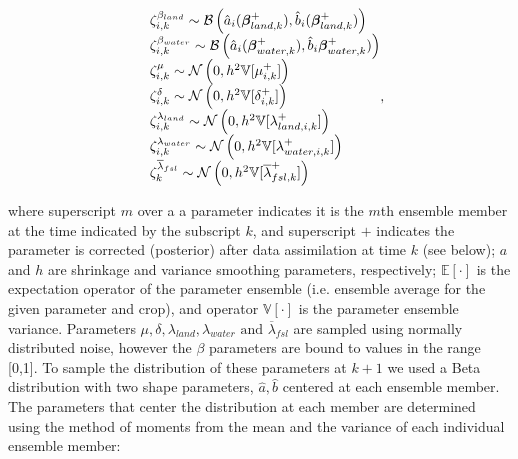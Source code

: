 \begin{equation}
\begin{matrix*}[l]
    &\zeta_{i,k}^{\beta_{land}} \sim \mathcal{B}\left(\hat{a}_i(\*\beta_{land,k}^{+}), \hat{b}_i(\*\beta_{land,k}^{+}) \right)\\
    &\zeta_{i,k}^{\beta_{water}} \sim \mathcal{B}\left(\hat{a}_i(\*\beta_{water,k}^{+}), \hat{b}_i\*\beta_{water,k}^{+}) \right)\\
    &\zeta_{i,k}^\mu \sim \mathcal{N}\left(0, h^2\mathbb{V}[\mu_{i,k}^+] \right)\\
    &\zeta_{i,k}^\delta \sim \mathcal{N}\left(0, h^2\mathbb{V}[\delta_{i,k}^+] \right)\\
    &\zeta_{i,k}^{\lambda_{land}} \sim \mathcal{N}\left(0, h^2\mathbb{V}[\lambda_{land,i,k}^+] \right)\\
    &\zeta_{i,k}^{\lambda_{water}} \sim \mathcal{N}\left(0, h^2\mathbb{V}[\lambda_{water,i,k}^+] \right)\\
    &\zeta_{k}^{\overline{\lambda}_{fsl}} \sim \mathcal{N}\left(0, h^2\mathbb{V}[\overline{\lambda}_{fsl,k}^+] \right)
    \end{matrix*},
\end{equation}

\noindent where superscript $m$ over a a parameter indicates it is the $m$th ensemble member at the time indicated by the subscript $k$, and superscript $+$ indicates the parameter is corrected (posterior) after data assimilation at time $k$ (see below); $a$ and $h$ are shrinkage and variance smoothing parameters, respectively; $\mathbb{E}[\cdot]$ is the expectation operator of the parameter ensemble (i.e. ensemble average for the given parameter and crop), and operator $\mathbb{V}[\cdot]$ is the parameter ensemble variance. Parameters $\mu, \delta, \lambda_{land}, \lambda_{water} \text{ and } \overline{\lambda}_{fsl}$ are sampled using normally distributed noise, however the $\beta$ parameters are bound to values in the range [0,1]. To sample the distribution of these parameters at $k+1$ we used a Beta distribution with two shape parameters, $\hat{a}, \hat{b}$ centered at each ensemble member. The parameters that center the distribution at each member are determined using the method of moments from the mean and the variance of each individual ensemble member: 

